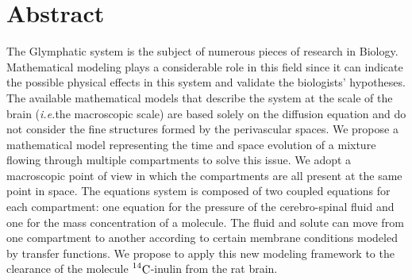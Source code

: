 \documentclass[10pt,letterpaper]{article}
\newcommand{\ie}{\emph{i.e.}\;}
\newcommand{\1}{^{(1)}}
\newcommand{\2}{^{(2)}}
\newcommand{\Cinulin}{$\prescript{14}{}{\text{C}}$-inulin }
\begin{document}
\section*{Abstract}
The Glymphatic system is the subject of numerous pieces of research in Biology. Mathematical modeling plays a considerable role in this field since it can indicate the possible physical effects in this system and validate the biologists' hypotheses. The available mathematical models that describe the system at the scale of the brain (\ie the macroscopic scale) are based solely on the diffusion equation and do not consider the fine structures formed by the perivascular spaces.   
 We propose a mathematical model representing the time and space evolution of a mixture flowing through multiple compartments to solve this issue. We adopt a macroscopic point of view in which the compartments are all present at the same point in space. The equations system is composed of two coupled equations for each compartment: one equation for the pressure of the cerebro-spinal fluid and one for the mass concentration of a molecule. The fluid and solute can move from one compartment to another according to certain membrane conditions modeled by transfer functions. We propose to apply this new modeling framework to the clearance of the molecule \Cinulin from the rat brain. 
 

\linenumbers

\end{document}
